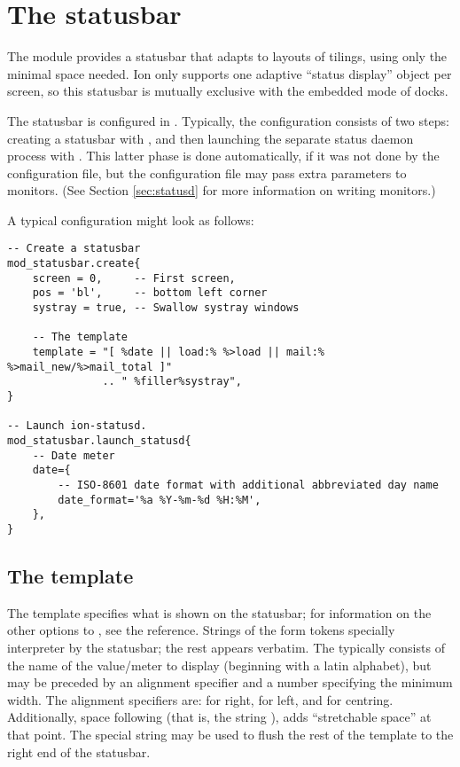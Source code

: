 \section{The statusbar}
\label{sec:statusbar}

The  module provides a statusbar that adapts to 
layouts of tilings, using only the minimal space needed. Ion only 
supports one adaptive ``status display'' object per screen, so this
statusbar is mutually exclusive with the embedded mode of  
docks. 

The statusbar is configured in . Typically,
the configuration consists of two steps: creating a statusbar with
, and then launching the separate
 status daemon process with 
. This latter phase is done
automatically, if it was not done by the configuration file, but
the configuration file may pass extra parameters to 
monitors. (See Section \ref{sec:statusd} for more information on
writing  monitors.)

A typical  configuration might look as follows:


\begin{verbatim}
-- Create a statusbar
mod_statusbar.create{
    screen = 0,     -- First screen, 
    pos = 'bl',     -- bottom left corner
    systray = true, -- Swallow systray windows

    -- The template
    template = "[ %date || load:% %>load || mail:% %>mail_new/%>mail_total ]"
               .. " %filler%systray",
}

-- Launch ion-statusd. 
mod_statusbar.launch_statusd{
    -- Date meter
    date={
        -- ISO-8601 date format with additional abbreviated day name
        date_format='%a %Y-%m-%d %H:%M',
    },      
}
\end{verbatim}


\subsection{The template}

The template specifies what is shown on the statusbar; for information
on the other options to , see the reference. 
Strings of the form  tokens specially interpreter by
the statusbar; the rest appears verbatim. The  typically
consists of the name of the value/meter to display (beginning with a latin
alphabet), but may be preceded by an alignment specifier and a number
specifying the minimum width. The alignment specifiers are: \codestr{>}
for right, \codestr{<} for left,  and \codestr{|} for centring. Additionally,
space following \codestr{\%} (that is, the string \codestr{\% }), adds
``stretchable space'' at that point. The special string 
may be used to flush the rest of the template to the right end of 
the statusbar. 

